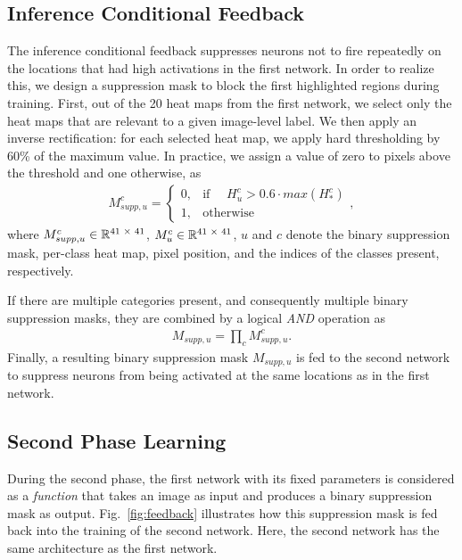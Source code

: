 \documentclass[10pt,twocolumn,letterpaper]{article}
\newcommand{\figref}[1]{Fig.~\ref{#1}}
\begin{document}
\subsection{Inference Conditional Feedback}
The inference conditional feedback suppresses neurons not to fire repeatedly on the locations that had high activations in the first network. In order to realize this, we design a suppression mask to block the first highlighted regions during training. First, out of the 20 heat maps from the first network, we select only the heat maps that are relevant to a given image-level label. We then apply an inverse rectification: for each selected heat map, we apply hard thresholding by 60\% of the maximum value. In practice, we assign a value of zero to pixels above the threshold and one otherwise, as
\begin{eqnarray}
   M_{supp,u}^{c} =
\begin{cases}
    0,& \text{if }  \quad H_{u}^{c} > 0.6 \cdot max(H_{*}^{c})\\
    1,              & \text{otherwise}
\end{cases},
\label{eq:binary_sup_mask}
\end{eqnarray}
where $M_{supp,u}^{c} \in \mathbb{R} \textsuperscript{41 $\times$ 41}$,  $M_{u}^{c}\in \mathbb{R} \textsuperscript{41 $\times$ 41}$, $u$ and $c$ denote the binary suppression mask, per-class heat map, pixel position, and the indices of the classes present, respectively.


If there are multiple categories present, and consequently multiple binary suppression masks, they are combined by a logical \textit{AND} operation as
\begin{eqnarray}
   M_{supp,u} =  \prod_{c} M_{supp,u}^{c}.
\label{eq:logicalAND}
\end{eqnarray}
Finally, a resulting binary suppression mask $M_{supp,u}$ is fed to the second network to suppress neurons from being activated at the same locations as in the first network.


\subsection{Second Phase Learning}
\label{sec:Second_phase}
During the second phase, the first network with its fixed parameters is considered as a \textit{function} that takes an image as input and produces a binary suppression mask as output. \figref{fig:feedback} illustrates how this suppression mask is fed back into the training of the second network. Here, the second network has the same architecture as the first network.
\end{document}
